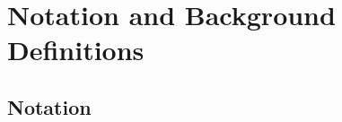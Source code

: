 \documentclass[11pt]{article}
\theoremstyle{definition}
\newcommand{\bitstrings}{\left\{0,1\right\}^*}
\newcommand{\rng}{F_{\texttt{PRNG}}}
\newcommand{\msg}{\texttt{msg}}
\newcommand{\sample}{\overset{\$}{\leftarrow}}
\begin{document}


\section{Notation and Background Definitions}

\subsection{Notation}



\end{document}
